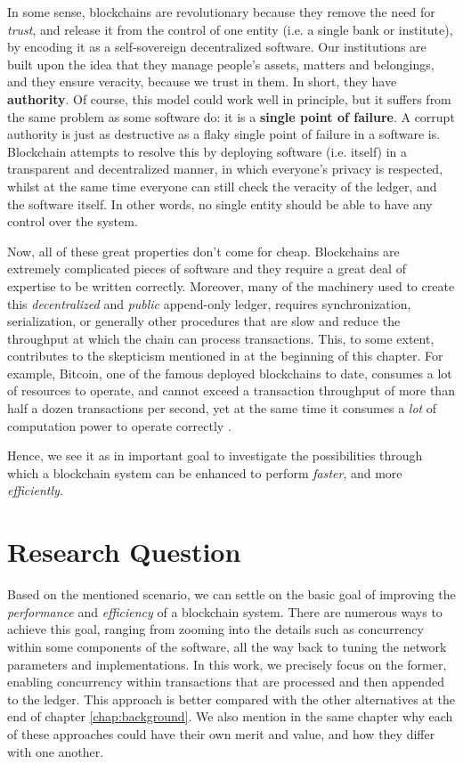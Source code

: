 In some sense, blockchains are revolutionary because they remove the need for \textit{trust}, and
release it from the control of one entity (i.e. a single bank or institute), by encoding it as a
self-sovereign decentralized software. Our institutions are built upon the idea that they manage
people's assets, matters and belongings, and they ensure veracity, because we trust in them. In
short, they have \textbf{authority}. Of course, this model could work well in principle, but it
suffers from the same problem as some software do: it is a \textbf{single point of failure}. A
corrupt authority is just as destructive as a flaky single point of failure in a software is.
Blockchain attempts to resolve this by deploying software (i.e. itself) in a transparent and
decentralized manner, in which everyone's privacy is respected, whilst at the same time everyone can
still check the veracity of the ledger, and the software itself. In other words, no single entity
should be able to have any control over the system.

Now, all of these great properties don't come for cheap. Blockchains are extremely complicated
pieces of software and they require a great deal of expertise to be written correctly. Moreover,
many of the machinery used to create this \textit{decentralized} and \textit{public} append-only
ledger, requires synchronization, serialization, or generally other procedures that are slow and
reduce the throughput at which the chain can process transactions. This, to some extent, contributes
to the skepticism mentioned in at the beginning of this chapter. For example, Bitcoin, one of the
famous deployed blockchains to date, consumes a lot of resources to operate, and cannot exceed a
transaction throughput of more than half a dozen transactions per second, yet at the same time it
consumes a \textit{lot} of computation power to operate correctly \cite{security_of_bitcoin}.

Hence, we see it as in important goal to investigate the possibilities through which a blockchain
system can be enhanced to perform \textit{faster}, and more \textit{efficiently}.

\section{Research Question} \label{chap_intro:sec:resarch_q}

Based on the mentioned scenario, we can settle on the basic goal of improving the
\textit{performance} and \textit{efficiency} of a blockchain system. There are numerous ways to
achieve this goal, ranging from zooming into the details such as concurrency within some components
of the software, all the way back to tuning the network parameters and implementations. In this
work, we precisely focus on the former, enabling concurrency within transactions that are processed
and then appended to the ledger. This approach is better compared with the other alternatives at the
end of chapter \ref{chap:background}. We also mention in the same chapter why each of these
approaches could have their own merit and value, and how they differ with one another.

